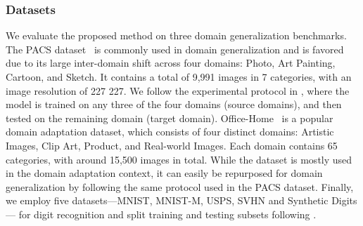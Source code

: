 \documentclass[runningheads]{llncs}
\begin{document}
\begin{table}[t]
	\begin{center}
	\caption{Comparision with the state-of-the-art domain generalization methods (\%) on the Office-Home dataset using a ResNet-18 architecture. Column title indicates the target domain.}
	\label{tab:OH_result}
\end{center}
\end{table}




\subsubsection{Datasets}

We evaluate the proposed method on three domain generalization benchmarks. 
The PACS dataset~\cite{pacs} is commonly used in domain generalization and is favored due to its large inter-domain shift across four domains: Photo, Art Painting, Cartoon, and Sketch. 
It contains a total of 9,991 images in 7 categories, with an image resolution of 227  227. 
We follow the experimental protocol in \cite{pacs}, where the model is trained on any three of the four domains (source domains), and then tested on the remaining domain (target domain). 
Office-Home~\cite{office-home} is a popular domain adaptation dataset, which consists of four distinct domains: Artistic Images, Clip Art, Product, and Real-world Images. 
Each domain contains 65 categories, with around 15,500 images in total. 
While the dataset is mostly used in the domain adaptation context, it can easily be repurposed for domain generalization by following the same protocol used in the PACS dataset. 
Finally, we employ five datasets---MNIST, MNIST-M, USPS, SVHN and Synthetic Digits--- for digit recognition and split training and testing subsets following \cite{xu2018deep}.
\end{document}
